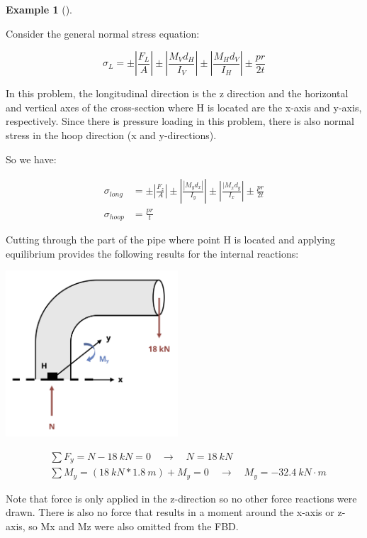 \documentclass[
  letterpaper,
  DIV=11,
  numbers=noendperiod]{scrreprt}
\theoremstyle{definition}
\newtheorem{example}{Example}[chapter]
\theoremstyle{remark}
\begin{document}
\begin{tcolorbox}
\begin{example}[]
\begin{tcolorbox}
Consider the general normal stress equation:

\[
\sigma_L= \pm\left|\frac{F_L}{A}\right| \pm\left|\frac{M_V d_H}{I_V}\right| \pm\left|\frac{M_H d_V}{I_H}\right| \pm \frac{p r}{2 t}
\]

In this problem, the longitudinal direction is the z direction and the
horizontal and vertical axes of the cross-section where H is located are
the x-axis and y-axis, respectively. Since there is pressure loading in
this problem, there is also normal stress in the hoop direction (x and
y-directions).

So we have:

\[
\begin{aligned}
\sigma_{long} & = \pm\left|\frac{F_z}{A}\right| \pm\left|\frac{\left|M_y d_x\right|}{I_y}\right| \pm\left|\frac{\mid M_x d_y}{I_x}\right| \pm \frac{p r}{2 t} \\
\sigma_{hoop} & =\frac{p r}{t}
\end{aligned}
\]

Cutting through the part of the pipe where point H is located and
applying equilibrium provides the following results for the internal
reactions:

\begin{center}
\includegraphics[width=2.53125in,height=\textheight]{images/CH14 PNGs/example 14.4 part 2.png}
\end{center}

\[
\begin{aligned}
&\sum F_y=N-18{~kN}=0 \quad\rightarrow\quad N=18{~kN} \\
&\sum M_y=(18{~kN}*1.8{~m})+M_y=0 \quad\rightarrow\quad M_y=-32.4{~kN}\cdot{m}
\end{aligned}
\]

Note that force is only applied in the z-direction so no other force
reactions were drawn. There is also no force that results in a moment
around the x-axis or z-axis, so Mx and Mz were also omitted from the
FBD.


\end{tcolorbox}
\end{example}
\end{tcolorbox}
\end{document}
